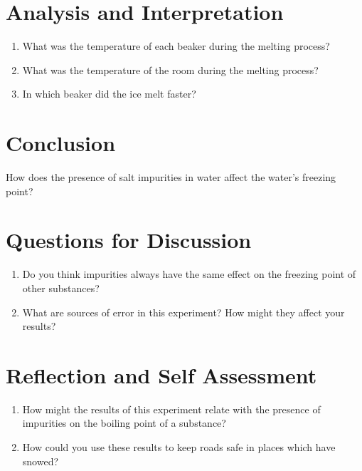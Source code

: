 \section{Analysis and Interpretation}
\begin{enumerate}
\item What was the temperature of each beaker during the melting process? 
\item What was the temperature of the room during the melting process?
\item In which beaker did the ice melt faster?  
\end{enumerate}

\section{Conclusion}
How does the presence of salt impurities in water affect the water’s freezing point?

\section{Questions for Discussion}
\begin{enumerate}
\item Do you think impurities always have the same effect on the freezing point of other substances? 
\item What are sources of error in this experiment? How might they affect your results?
\end{enumerate}

\section{Reflection and Self Assessment}
\begin{enumerate}
\item How might the results of this experiment relate with the presence of impurities on the boiling point of a substance?
\item How could you use these results to keep roads safe in places which have snowed?
\end{enumerate}